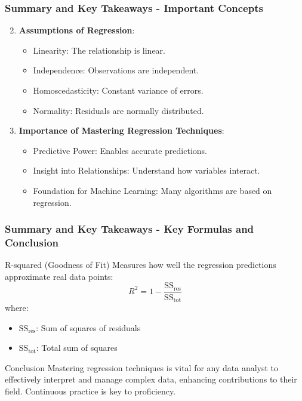 \documentclass[aspectratio=169]{beamer}
\begin{document}
\begin{frame}[fragile]
    \frametitle{Summary and Key Takeaways - Important Concepts}
    \begin{enumerate}
        \setcounter{enumi}{1}
        \item \textbf{Assumptions of Regression}:
            \begin{itemize}
                \item Linearity: The relationship is linear.
                \item Independence: Observations are independent.
                \item Homoscedasticity: Constant variance of errors.
                \item Normality: Residuals are normally distributed.
            \end{itemize}        

        \item \textbf{Importance of Mastering Regression Techniques}:
            \begin{itemize}
                \item Predictive Power: Enables accurate predictions.
                \item Insight into Relationships: Understand how variables interact.
                \item Foundation for Machine Learning: Many algorithms are based on regression.
            \end{itemize}
    \end{enumerate}    
\end{frame}

\begin{frame}[fragile]
    \frametitle{Summary and Key Takeaways - Key Formulas and Conclusion}
    \begin{block}{R-squared (Goodness of Fit)}
        Measures how well the regression predictions approximate real data points:
        \[
        R^2 = 1 - \frac{\text{SS}_{\text{res}}}{\text{SS}_{\text{tot}}}
        \]
        where:
        \begin{itemize}
            \item \( \text{SS}_{\text{res}} \): Sum of squares of residuals
            \item \( \text{SS}_{\text{tot}} \): Total sum of squares
        \end{itemize}
    \end{block}

    \begin{block}{Conclusion}
        Mastering regression techniques is vital for any data analyst to effectively interpret and manage complex data, enhancing contributions to their field. Continuous practice is key to proficiency.
    \end{block}
\end{frame}
\end{document}
